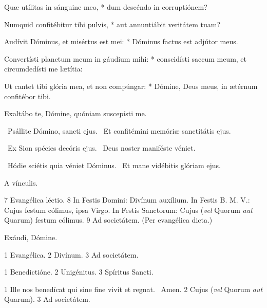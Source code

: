 Quæ utílitas in sánguine meo, * dum descéndo in corruptiónem?

Numquid confitébitur tibi pulvis, * aut annuntiábit veritátem tuam?

Audívit Dóminus, et misértus est mei: * Dóminus factus est adjútor meus.

Convertísti planctum meum in gáudium mihi: * conscidísti saccum meum, et circumdedísti me lætítia:

Ut cantet tibi glória mea, et non compúngar: * Dómine, Deus meus, in ætérnum confitébor tibi.

 Exaltábo te, Dómine, quóniam suscepísti me.


\V\ Psállite Dómino, sancti ejus. \R\ Et confitémini memóriæ sanctitátis ejus.


\V\ Ex Sion spécies decóris ejus. \R\ Deus noster maniféste véniet.


\V\ Hódie sciétis quia véniet Dóminus. \R\ Et mane vidébitis glóriam ejus.


 A vínculis.

 7 Evangélica léctio. 8 In Festis Domini: Divínum auxílium. In Festis B. M. V.: Cujus festum cólimus, ipsa Virgo. In Festis Sanctorum: Cujus (\textit{vel} Quorum \textit{aut} Quarum) festum cólimus. 9 Ad societátem. (Per evangélica dicta.)


 Exáudi, Dómine.


 1 Evangélica. 2 Divínum. 3 Ad societátem.


 1 Benedictióne. 2 Unigénitus. 3 Spíritus Sancti.


 1 Ille nos benedícat qui sine fine vivit et regnat. \R\ Amen. 2 Cujus (\textit{vel} Quorum \textit{aut} Quarum). 3 Ad societátem.

